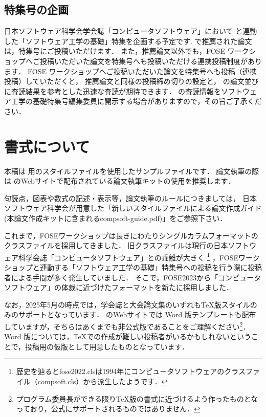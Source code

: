 \documentclass[T,J]{fose} %
\begin{document}
\subsection{特集号の企画}

日本ソフトウェア科学会学会誌「コンピュータソフトウェア」において {\foseabbrev} と連動した「ソフトウェア工学の基礎」特集を企画する予定です. 
{\foseabbrev} で推薦された論文は，特集号にご投稿いただけます．
また，推薦論文以外でも，FOSE ワークショップへご投稿いただいた論文を特集号へも投稿いただける連携投稿制度があります．
FOSE ワークショップへご投稿いただいた論文を特集号へも投稿（連携投稿）していただくと，
推薦論文と同様の投稿締め切りの設定と，{\foseabbrev} の論文並びに査読結果を参考とした迅速な査読が期待できます．
{\foseabbrev} の査読情報をソフトウェア工学の基礎特集号編集委員に開示する場合がありますので，その旨ご了承ください．


\section{書式について} \label{sec:PaperStyle}
本稿は \foseabbrev 用のスタイルファイルを使用したサンプルファイルです．
論文執筆の際は \foseabbrev のWebサイトで配布されている論文執筆キットの使用を推奨します．

句読点，図表や数式の記述・表示等，論文執筆のルールにつきましては，
日本ソフトウェア科学会が用意した「新しいスタイルファイルによる論文作成ガイド(本論文作成キットに含まれるcompsoft-guide.pdf)」をご参照下さい．

これまで，FOSEワークショップは長きにわたりシングルカラムフォーマットのクラスファイルを採用してきました．
旧クラスファイルは現行の日本ソフトウェア科学会誌「コンピュータソフトウェア」との乖離が大きく
\footnote{歴史を辿るとfose2022.clsは1994年にコンピュータソフトウェアのクラスファイル（compsoft.cls）から派生したようです．}
，FOSEワークショップと連動する「ソフトウェア工学の基礎」特集号への投稿を行う際に投稿者による手間が多く発生していました．
そこで，FOSE2023から「コンピュータソフトウェア」の体裁に近づけたフォーマットを新たに採用しました．

なお，2025年5月の時点では，学会誌と大会論文集のいずれもTeX版スタイルのみのサポートとなっています．
\foseabbrev のWebサイトでは Word 版テンプレートも配布していますが，そちらはあくまでも非公式版であることをご理解ください\footnote{プログラム委員長ができる限りTeX版の書式に近づけるよう作ったものとなっており，公式にサポートされるものではありません．}．
Word 版については，\TeX での作成が難しい投稿者がいるかもしれないということで，投稿用の仮版として用意したものとなっています．
\end{document}
